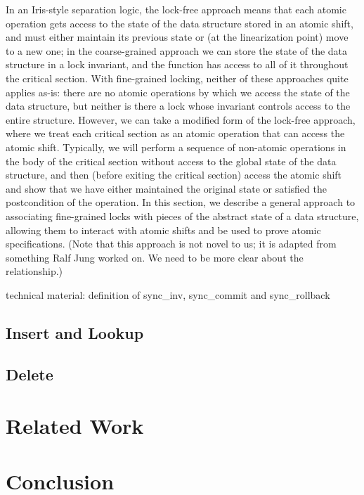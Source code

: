 \documentclass[11pt]{article} %
\begin{document}
In an Iris-style separation logic, the lock-free approach means that each atomic operation gets access to the state of the data structure stored in an atomic shift, and must either maintain its previous state or (at the linearization point) move to a new one; in the coarse-grained approach we can store the state of the data structure in a lock invariant, and the function has access to all of it throughout the critical section. With fine-grained locking, neither of these approaches quite applies as-is: there are no atomic operations by which we access the state of the data structure, but neither is there a lock whose invariant controls access to the entire structure. However, we can take a modified form of the lock-free approach, where we treat each critical section as an atomic operation that can access the atomic shift. Typically, we will perform a sequence of non-atomic operations in the body of the critical section without access to the global state of the data structure, and then (before exiting the critical section) access the atomic shift and show that we have either maintained the original state or satisfied the postcondition of the operation. In this section, we describe a general approach to associating fine-grained locks with pieces of the abstract state of a data structure, allowing them to interact with atomic shifts and be used to prove atomic specifications. (Note that this approach is not novel to us; it is adapted from something Ralf Jung worked on. We need to be more clear about the relationship.)

technical material: definition of sync\_inv, sync\_commit and sync\_rollback

\subsection{Insert and Lookup}
\subsection{Delete}

\section{Related Work}
\section{Conclusion}
\end{document}
